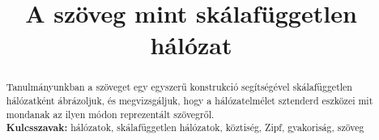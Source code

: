 \documentclass{llncs}
\newcommand{\marci}[1]{{\color{marcicolor} #1}}
\begin{document}


\title{A szöveg mint skálafüggetlen hálózat}
\author{\institute{}}
\maketitle


\begin{abstract}
Tanulmányunkban a szöveget egy egyszerű konstrukció segítségével
skálafüggetlen hálózatként ábrázoljuk,
és megvizsgáljuk, hogy a hálózatelmélet sztenderd eszközei
mit mondanak az ilyen módon reprezentált szövegről.
\\{\bf Kulcsszavak:} hálózatok, skálafüggetlen hálózatok, köztiség, Zipf, gyakoriság, szöveg
\end{abstract}


 
% 
%
%
%
%
%
%


\end{document}
